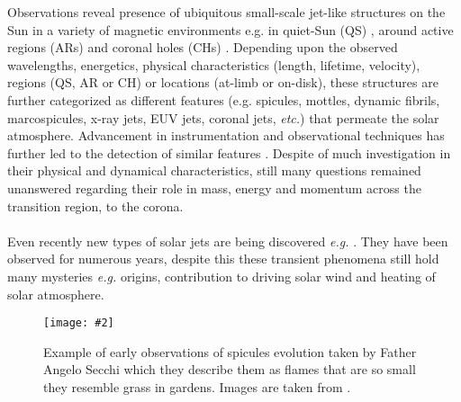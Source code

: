 \documentclass[12pt]{ociamthesis}
\newcommand{\mfig}[4]{
  \begin{figure}
  \begin{center}
  \texttt{[image: \#2]}
  \caption{#3}
  \label{#4}
  \end{center}
  \end{figure}}
\newcommand{\np}{\\ \\}
\begin{document}
Observations reveal presence of ubiquitous small-scale jet-like structures on the Sun in a variety of magnetic environments e.g. in quiet-Sun (QS) \citep{Pontieu2007astroph2081D,Rouppe2007ApJ660L169R,Pereira2012,Pereira2014ApJ}, around active regions (ARs) \citep{Pontieu2007astroph2081D,Pereira2012,Rouppe2013ApJ77656R,Gafeira2017ApJS2296G} and coronal holes (CHs) \citep{Yamauchi2005ApJ629572Y,Moreno2008ApJ673L211M,Pereira2012,Young2015ApJ801124Y}. Depending upon the observed wavelengths, energetics, physical characteristics (length, lifetime, velocity), regions (QS, AR or CH) or locations (at-limb or on-disk), these structures are further categorized as different features (e.g. spicules, mottles, dynamic fibrils, marcospicules, x-ray jets, EUV jets, coronal jets, \textit{etc.}) that permeate the solar atmosphere. Advancement in instrumentation and observational techniques has further led to the detection of similar features \citep[\textit{e.g.}][]{Gafeira2017, Cho2019ApJ884L38C}. Despite of much investigation in their physical and dynamical characteristics, still many questions remained unanswered regarding their role in mass, energy and  momentum across the transition region, to the corona. \np
Even recently new types of solar jets are being discovered \textit{e.g.} \citep{Cho2019ApJ884L38C}. They have been observed for numerous years, despite this these transient phenomena still hold many mysteries \textit{e.g.} origins, contribution to driving solar wind and heating of solar atmosphere.
%
%
\mfig{0.75}{figures/flammes_alt.png}{Example of early observations of spicules evolution taken by Father Angelo Secchi which they describe them as flames that are so small they resemble grass in gardens. Images are taken from \cite{Secchi1877}.}{de_flammes}
\end{document}
